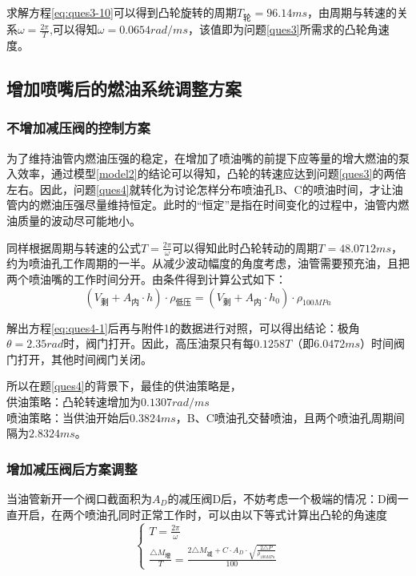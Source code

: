 \documentclass[withoutpreface,bwprint]{cumcmthesis} %
\begin{document}
求解方程\cref{eq:ques3-10}可以得到凸轮旋转的周期$T_{\text{轮}} = 96.14ms$，由周期与转速的关系$\omega = \frac{2\pi}{T}$,可以得知$\omega = 0.0654 rad/ms$，该值即为问题\ref{ques3}所需求的凸轮角速度。
\subsection{增加喷嘴后的燃油系统调整方案}
\subsubsection{不增加减压阀的控制方案}
为了维持油管内燃油压强的稳定，在增加了喷油嘴的前提下应等量的增大燃油的泵入效率，通过模型\ref{model2}的结论可以得知，凸轮的转速应达到问题\ref{ques3}的两倍左右。因此，问题\ref{ques4}就转化为讨论怎样分布喷油孔B、C的喷油时间，才让油管内的燃油压强尽量维持恒定。此时的“恒定”是指在时间变化的过程中，油管内燃油质量的波动尽可能地小。

同样根据周期与转速的公式$T= \frac{2\pi}{\omega}$可以得知此时凸轮转动的周期$T=48.0712ms$，约为喷油孔工作周期的一半。从减少波动幅度的角度考虑，油管需要预充油，且把两个喷油嘴的工作时间分开。由条件得到计算公式如下：
\begin{equation}
(V_{\text{剩}}+A_{\text{内}}\cdot h)\cdot\rho_{\text{低压}} = (V_{\text{剩}}+A_{\text{内}}\cdot h_{0})\cdot \rho_{100MPa}\label{eq:ques4-1}	
\end{equation}

解出方程\cref{eq:ques4-1}后再与附件1的数据进行对照，可以得出结论：极角$\theta = 2.35rad$时，阀门打开。因此，高压油泵只有每$0.1258T$（即$6.0472ms$）时间阀门打开，其他时间阀门关闭。

所以在题\ref{ques4}的背景下，最佳的供油策略是，\\
供油策略：凸轮转速增加为$0.1307rad/ms$\\
喷油策略：当供油开始后$0.3824ms$，B、C喷油孔交替喷油，且两个喷油孔周期间隔为$2.8324ms$。

\subsubsection{增加减压阀后方案调整}
当油管新开一个阀口截面积为$A_{D}$的减压阀D后，不妨考虑一个极端的情况：D阀一直开启，在两个喷油孔同时正常工作时，可以由以下等式计算出凸轮的角速度
\begin{equation}
\begin{cases}
T= \frac{2\pi}{\omega}\\
 \frac{\triangle M_{\text{增}}}{T} = \frac{2\triangle M_{\text{减}}+C\cdot A_{D}\cdot \sqrt{\frac{2\triangle P}{\rho_{100MPa}}}}{100}
\end{cases}\label{eq:ques5-1}	
\end{equation}
\end{document}
